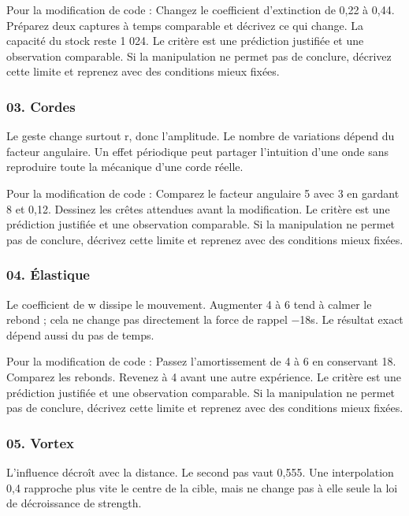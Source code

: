 \documentclass[
  canadien,
  11pt,
  letterpaper,
]{article}
\begin{document}
Pour la modification de code : Changez le coefficient d'extinction de
0,22 à 0,44. Préparez deux captures à temps comparable et décrivez ce
qui change. La capacité du stock reste 1 024. Le critère est une
prédiction justifiée et une observation comparable. Si la manipulation
ne permet pas de conclure, décrivez cette limite et reprenez avec des
conditions mieux fixées.

\subsubsection{03. Cordes}\label{cordes}

Le geste change surtout r, donc l'amplitude. Le nombre de variations
dépend du facteur angulaire. Un effet périodique peut partager
l'intuition d'une onde sans reproduire toute la mécanique d'une corde
réelle.

Pour la modification de code : Comparez le facteur angulaire 5 avec 3 en
gardant 8 et 0,12. Dessinez les crêtes attendues avant la modification.
Le critère est une prédiction justifiée et une observation comparable.
Si la manipulation ne permet pas de conclure, décrivez cette limite et
reprenez avec des conditions mieux fixées.

\subsubsection{04. Élastique}\label{uxe9lastique}

Le coefficient de w dissipe le mouvement. Augmenter 4 à 6 tend à calmer
le rebond ; cela ne change pas directement la force de rappel −18s. Le
résultat exact dépend aussi du pas de temps.

Pour la modification de code : Passez l'amortissement de 4 à 6 en
conservant 18. Comparez les rebonds. Revenez à 4 avant une autre
expérience. Le critère est une prédiction justifiée et une observation
comparable. Si la manipulation ne permet pas de conclure, décrivez cette
limite et reprenez avec des conditions mieux fixées.

\subsubsection{05. Vortex}\label{vortex}

L'influence décroît avec la distance. Le second pas vaut 0,555. Une
interpolation 0,4 rapproche plus vite le centre de la cible, mais ne
change pas à elle seule la loi de décroissance de strength.
\end{document}
